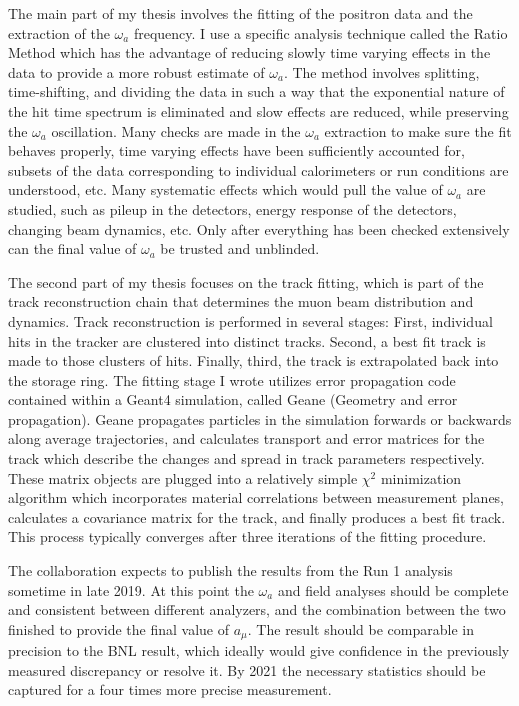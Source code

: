 \documentclass[12pt,letterpaper]{article}
\def\wa{$\omega_{a}$\xspace}
\def\chisq{$\chi^{2}$\xspace}
\def\amu{$a_{\mu}$\xspace}
\begin{document}
The main part of my thesis involves the fitting of the positron data and the extraction of the \wa frequency. I use a specific analysis technique called the Ratio Method which has the advantage of reducing slowly time varying effects in the data to provide a more robust estimate of \wa. The method involves splitting, time-shifting, and dividing the data in such a way that the exponential nature of the hit time spectrum is eliminated and slow effects are reduced, while preserving the \wa oscillation. Many checks are made in the \wa extraction to make sure the fit behaves properly, time varying effects have been sufficiently accounted for, subsets of the data corresponding to individual calorimeters or run conditions are understood, etc. Many systematic effects which would pull the value of \wa are studied, such as pileup in the detectors, energy response of the detectors, changing beam dynamics, etc. Only after everything has been checked extensively can the final value of \wa be trusted and unblinded. 


The second part of my thesis focuses on the track fitting, which is part of the track reconstruction chain that determines the muon beam distribution and dynamics. Track reconstruction is performed in several stages: First, individual hits in the tracker are clustered into distinct tracks. Second, a best fit track is made to those clusters of hits. Finally, third, the track is extrapolated back into the storage ring. The fitting stage I wrote utilizes error propagation code contained within a Geant4 simulation, called Geane (Geometry and error propagation). Geane propagates particles in the simulation forwards or backwards along average trajectories, and calculates transport and error matrices for the track which describe the changes and spread in track parameters respectively. These matrix objects are plugged into a relatively simple \chisq minimization algorithm which incorporates material correlations between measurement planes, calculates a covariance matrix for the track, and finally produces a best fit track. This process typically converges after three iterations of the fitting procedure.


The collaboration expects to publish the results from the Run 1 analysis sometime in late 2019. At this point the \wa and field analyses should be complete and consistent between different analyzers, and the combination between the two finished to provide the final value of \amu. The result should be comparable in precision to the BNL result, which ideally would give confidence in the previously measured discrepancy or resolve it. By 2021 the necessary statistics should be captured for a four times more precise measurement.
\end{document}
